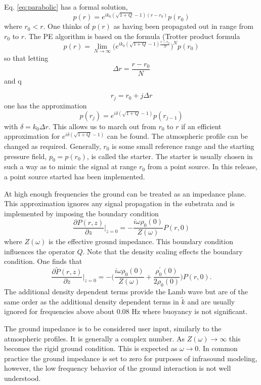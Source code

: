 Eq. \ref{eq:parabolic} has a formal solution, 
\[
p(r)=e^{ik_0(\sqrt{1+Q}-1)(r-r_0)} p(r_0)
\]
where $r_0<r$. One thinks of $p(r)$ as having been propagated out in range from $r_0$ to $r$. The PE algorithm is based on the formula (Trotter product formula \cite{stoer2013introduction} 
\begin{equation}\label{eq:trotter_prod}
p(r)=\lim_{N\rightarrow\infty}\Big(e^{ik_0(\sqrt{1+Q}-1)\frac{r-r_0}{N}}\Big)^N p(r_0)
\end{equation}
so that letting 
\[
\Delta r=\frac{r-r_0}{N}
\]
and q

\[
r_j=r_0+j\Delta r
\]
one has the approximation 
\begin{equation}\label{eq:split_step}
p(r_j)=e^{i\delta(\sqrt{1+Q}-1)}p(r_{j-1})
\end{equation}
with $\delta=k_0\Delta r$. This allows us to march out from $r_0$ to $r$ if an efficient approximation for $e^{i\delta(\sqrt{1+Q}-1)}$ can be found. The atmospheric profile can be changed as required. Generally, $r_0$ is some small reference range and the starting pressure field, $p_0=p(r_0)$, is called the starter. The starter is usually chosen in such a way as to mimic the signal at range $r_0$ from a point source. In this release, a point source started has been implemented. 

At high enough frequencies the ground can be treated as an impedance plane. This approximation ignores any signal propagation in the substrata and is implemented by imposing the boundary condition 
\begin{equation}\label{eq:impedance}
\frac{\partial P(r,z)}{\partial z}\big|_{z=0}=-\frac{i\omega\rho_0(0)}{Z(\omega)}P(r,0)
\end{equation}
where $Z(\omega)$ is the effective ground impedance. This boundary condition influences the operator $Q$. Note that the density scaling effects the boundary condition. One finds that 
\[
\frac{\partial \tilde P(r,z)}{\partial z}\big|_{z=0}
=
-\Big(\frac{i\omega\rho_0(0)}{Z(\omega)}+\frac{\rho_0^\prime(0)}{2\rho_0(0)}\Big)P(r,0).
\]
The additional density dependent terms provide the Lamb wave but are of the same order as the additional density dependent terms in $\tilde k$ and are usually ignored for frequencies above about 0.08 Hz where buoyancy is not significant. 

The ground impedance is to be considered user input, similarly to the atmospheric profiles. It is generally a complex number. As $Z(\omega)\rightarrow \infty$ this becomes the rigid ground condition. This is expected as $\omega\rightarrow 0$. In common practice the ground impedance is set to zero for purposes of infrasound modeling, however, the low frequency behavior of the ground interaction is not well understood. 

